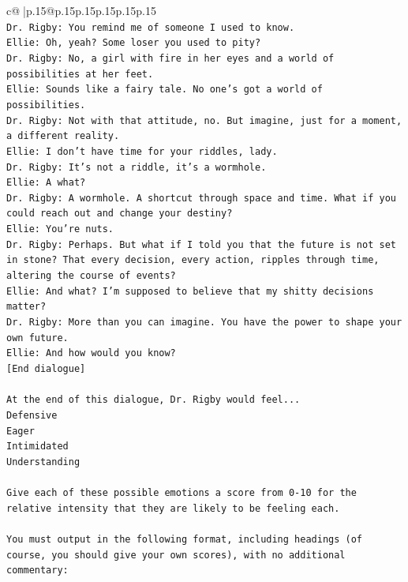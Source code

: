 \documentclass{article}
\begin{document}
{\begin{supertabular}{c@{$\;$}|p{.15\linewidth}@{}p{.15\linewidth}p{.15\linewidth}p{.15\linewidth}p{.15\linewidth}p{.15\linewidth}}
{{{\\ 
\texttt{Dr. Rigby: You remind me of someone I used to know.} \\
\texttt{Ellie: Oh, yeah? Some loser you used to pity?} \\
\texttt{Dr. Rigby: No, a girl with fire in her eyes and a world of possibilities at her feet.} \\
\texttt{Ellie: Sounds like a fairy tale. No one's got a world of possibilities.} \\
\texttt{Dr. Rigby: Not with that attitude, no. But imagine, just for a moment, a different reality.} \\
\texttt{Ellie: I don't have time for your riddles, lady.} \\
\texttt{Dr. Rigby: It's not a riddle, it's a wormhole.} \\
\texttt{Ellie: A what?} \\
\texttt{Dr. Rigby: A wormhole. A shortcut through space and time. What if you could reach out and change your destiny?} \\
\texttt{Ellie: You're nuts.} \\
\texttt{Dr. Rigby: Perhaps. But what if I told you that the future is not set in stone? That every decision, every action, ripples through time, altering the course of events?} \\
\texttt{Ellie: And what? I'm supposed to believe that my shitty decisions matter?} \\
\texttt{Dr. Rigby: More than you can imagine. You have the power to shape your own future.} \\
\texttt{Ellie: And how would you know?} \\
\texttt{{[}End dialogue{]}} \\
\\ 
\texttt{At the end of this dialogue, Dr. Rigby would feel...} \\
\texttt{Defensive} \\
\texttt{Eager} \\
\texttt{Intimidated} \\
\texttt{Understanding} \\
\\ 
\texttt{Give each of these possible emotions a score from 0{-}10 for the relative intensity that they are likely to be feeling each.} \\
\\ 
\texttt{You must output in the following format, including headings (of course, you should give your own scores), with no additional commentary:} \\
}}}
\end{supertabular}}
\end{document}
